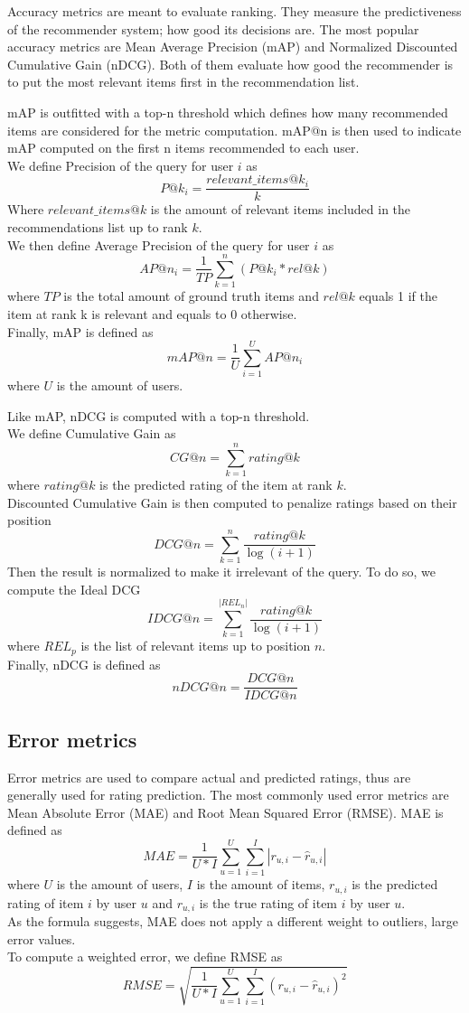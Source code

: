 Accuracy metrics are meant to evaluate ranking. They measure the predictiveness of the recommender system; how good its decisions are. The most popular accuracy metrics are Mean Average Precision (mAP) and Normalized Discounted Cumulative Gain (nDCG). Both of them evaluate how good the recommender is to put the most relevant items first in the recommendation list.\par
mAP is outfitted with a top-n threshold which defines how many recommended items are considered for the metric computation. mAP@n is then used to indicate mAP computed on the first n items recommended to each user.\\
We define Precision of the query for user $i$ as
\[ P@k_i = \frac{relevant\_items@k_i}{k} \]
Where $relevant\_items@k$ is the amount of relevant items included in the recommendations list up to rank $k$.\\
We then define Average Precision of the query for user $i$ as
\[ AP@n_i = \frac{1}{TP} \sum_{k=1}^{n} (P@k_i * rel@k) \]
where $TP$ is the total amount of ground truth items and $rel@k$ equals 1 if the item at rank k is relevant and equals to 0 otherwise.\\
Finally, mAP is defined as
\[ mAP@n = \frac{1}{U} \sum_{i=1}^{U} AP@n_i \]
where $U$ is the amount of users.\par
Like mAP, nDCG is computed with a top-n threshold.\\
We define Cumulative Gain as
\[ CG@n = \sum_{k=1}^{n} rating@k \]
where $rating@k$ is the predicted rating of the item at rank $k$.\\
Discounted Cumulative Gain is then computed to penalize ratings based on their position
\[ DCG@n = \sum_{k=1}^{n} \frac{rating@k}{\log(i+1)} \]
Then the result is normalized to make it irrelevant of the query. To do so, we compute the Ideal DCG
\[ IDCG@n = \sum_{k=1}^{|REL_n|} \frac{rating@k}{\log(i+1)} \]
where $REL_p$ is the list of relevant items up to position $n$.\\
Finally, nDCG is defined as
\[ nDCG@n = \frac{DCG@n}{IDCG@n} \]


\subsection{Error metrics}

Error metrics are used to compare actual and predicted ratings, thus are generally used for rating prediction. The most commonly used error metrics are Mean Absolute Error (MAE) and Root Mean Squared Error (RMSE).
MAE is defined as
\[ MAE = \frac{1}{U*I} \sum_{u=1}^{U} \sum_{i=1}^{I} |r_{u,i} - \hat{r}_{u,i}| \]
where $U$ is the amount of users, $I$ is the amount of items, $r_{u,i}$ is the predicted rating of item $i$ by user $u$ and $r_{u,i}$ is the true rating of item $i$ by user $u$.\\
As the formula suggests, MAE does not apply a different weight to outliers, large error values.\\
To compute a weighted error, we define RMSE as
\[ RMSE = \sqrt{\frac{1}{U*I} \sum_{u=1}^{U} \sum_{i=1}^{I} (r_{u,i} - \hat{r}_{u,i})^2} \]


